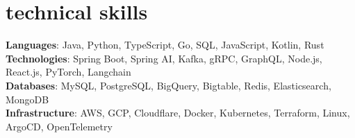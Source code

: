 \documentclass[letterpaper,11pt]{article}
\begin{document}
\section{technical skills}
\begin{itemize}[leftmargin=0.15in, label={}]
  \small{\item{
   \textbf{Languages}{: Java, Python, TypeScript, Go, SQL, JavaScript, Kotlin, Rust } \\
   \textbf{Technologies}{: Spring Boot, Spring AI, Kafka, gRPC, GraphQL, Node.js, React.js, PyTorch, Langchain} \\
   \textbf{Databases}{: MySQL, PostgreSQL, BigQuery, Bigtable, Redis, Elasticsearch, MongoDB} \\
   \textbf{Infrastructure}{: AWS, GCP, Cloudflare, Docker, Kubernetes, Terraform, Linux, ArgoCD, OpenTelemetry} \\
  }}
\end{itemize}

\end{document}
